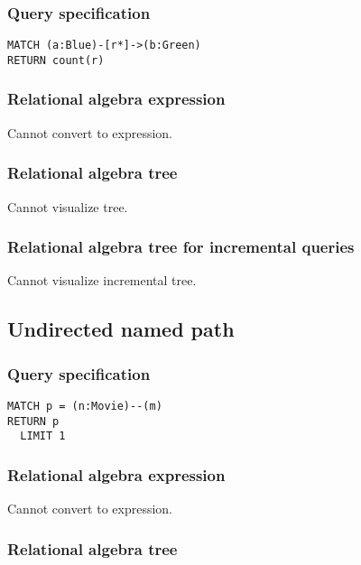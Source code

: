 \subsubsection*{Query specification}

\begin{lstlisting}
MATCH (a:Blue)-[r*]->(b:Green)
RETURN count(r)
\end{lstlisting}

\subsubsection*{Relational algebra expression}

Cannot convert to expression.

\subsubsection*{Relational algebra tree}

Cannot visualize tree.

\subsubsection*{Relational algebra tree for incremental queries}

Cannot visualize incremental tree.

\subsection{Undirected named path}

\subsubsection*{Query specification}

\begin{lstlisting}
MATCH p = (n:Movie)--(m)
RETURN p
  LIMIT 1
\end{lstlisting}

\subsubsection*{Relational algebra expression}

Cannot convert to expression.

\subsubsection*{Relational algebra tree}

